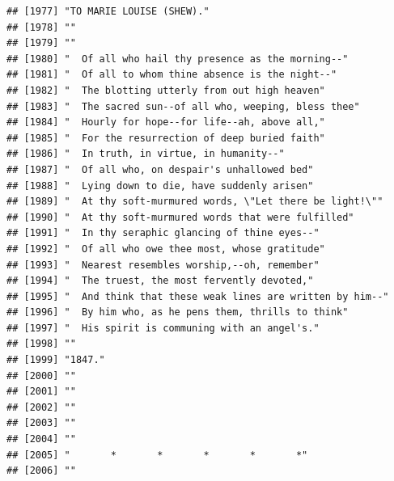 \documentclass{article}\usepackage[]{graphicx}\usepackage[]{color}
\makeatletter
\newenvironment{kframe}{%
 \def\at@end@of@kframe{}%
 \ifinner\ifhmode%
  \def\at@end@of@kframe{\end{minipage}}%
  \begin{minipage}{\columnwidth}%
 \fi\fi%
 \def\FrameCommand##1{\hskip\@totalleftmargin \hskip-\fboxsep
 \colorbox{shadecolor}{##1}\hskip-\fboxsep
     \hskip-\linewidth \hskip-\@totalleftmargin \hskip\columnwidth}%
 \MakeFramed {\advance\hsize-\width
   \@totalleftmargin\z@ \linewidth\hsize
   \@setminipage}}%
 {\par\unskip\endMakeFramed%
 \at@end@of@kframe}
\newenvironment{knitrout}{}{} %
\makeatother
\begin{document}
\begin{knitrout}
\begin{kframe}
\begin{verbatim}
## [1977] "TO MARIE LOUISE (SHEW)."                                                     
## [1978] ""                                                                            
## [1979] ""                                                                            
## [1980] "  Of all who hail thy presence as the morning--"                             
## [1981] "  Of all to whom thine absence is the night--"                               
## [1982] "  The blotting utterly from out high heaven"                                 
## [1983] "  The sacred sun--of all who, weeping, bless thee"                           
## [1984] "  Hourly for hope--for life--ah, above all,"                                 
## [1985] "  For the resurrection of deep buried faith"                                 
## [1986] "  In truth, in virtue, in humanity--"                                        
## [1987] "  Of all who, on despair's unhallowed bed"                                   
## [1988] "  Lying down to die, have suddenly arisen"                                   
## [1989] "  At thy soft-murmured words, \"Let there be light!\""                       
## [1990] "  At thy soft-murmured words that were fulfilled"                            
## [1991] "  In thy seraphic glancing of thine eyes--"                                  
## [1992] "  Of all who owe thee most, whose gratitude"                                 
## [1993] "  Nearest resembles worship,--oh, remember"                                  
## [1994] "  The truest, the most fervently devoted,"                                   
## [1995] "  And think that these weak lines are written by him--"                      
## [1996] "  By him who, as he pens them, thrills to think"                             
## [1997] "  His spirit is communing with an angel's."                                  
## [1998] ""                                                                            
## [1999] "1847."                                                                       
## [2000] ""                                                                            
## [2001] ""                                                                            
## [2002] ""                                                                            
## [2003] ""                                                                            
## [2004] ""                                                                            
## [2005] "       *       *       *       *       *"                                    
## [2006] ""                                                                            

\end{verbatim}
\end{kframe}
\end{knitrout}
\end{document}
